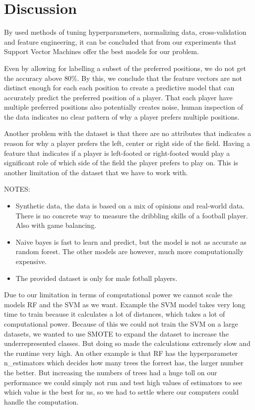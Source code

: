 \section{Discussion}

By used methods of tuning hyperparameters, normalizing data, cross-validation and feature engineering, it can be concluded that from our experiments that Support Vector Machines offer the best models for our problem. 
\par
Even by allowing for labelling a subset of the preferred positions, we do not get the accuracy above $80\%$. By this, we conclude that the feature vectors are not distinct enough for each each position to create a predictive model that can accurately predict the preferred position of a player. That each player have multiple preferred positions also potentially creates noise, human inspection of the data indicates no clear pattern of why a player prefers multiple positions.
\par
Another problem with the dataset is that there are no attributes that indicates a reason for why a player prefers the left, center or right side of the field. Having a feature that indicates if a player is left-footed or right-footed would play a significant role of which side of the field the player prefers to play on. This is another limitation of the dataset that we have to work with. 

NOTES:
\begin{itemize}
    \item Synthetic data, the data is based on a mix of opinions and real-world data. There is no concrete way to measure the dribbling skills of a football player. Also with game balancing.
    \item Naive bayes is fast to learn and predict, but the model is not as accurate as random forest. The other models are however, much more computationally expensive. 
    \item The provided dataset is only for male fotball players.
\end{itemize}


Due to our limitation in terms of computational power we cannot scale the models RF and the SVM as we want. 
Example the SVM model takes very long time to train because it calculates a lot of distances, which takes a lot of computational power. 
Because of this we could not train the SVM on a large datasets, we wanted to use SMOTE to expand the dataset to increase the underrepresented classes.
But doing so made the calculations extremely slow and the runtime very high. An other example is that RF has the hyperparameter n\_estimators which decides how many trees the forrest has, the larger number the better. 
But increasing the numbers of trees had a huge toll on our performance we could simply not run and test high values of estimators to see which value is the best for us, so we had to settle where our computers could handle the computation.




